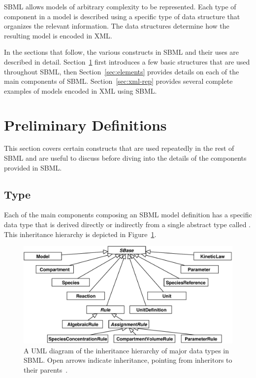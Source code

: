 \documentclass[10pt]{cekarticle}
\newcommand{\vref}[1]{\ref{#1}}
\newcommand{\changed}[1]{\textcolor{BrickRed}{#1}}
\begin{document}
SBML allows models of arbitrary complexity to be represented.  Each type of
component in a model is described using a specific type of data structure
that organizes the relevant information.  The data structures determine how
the resulting model is encoded in XML.

In the sections that follow, the various constructs in SBML and their uses
are described in detail.  Section~\ref{sec:general} first introduces a few
basic structures that are used throughout SBML, then
Section~\ref{sec:elements} provides details on each of the main components
of SBML.  Section~\ref{sec:xml-rep} provides several complete examples of
models encoded in XML using SBML.


\section{Preliminary Definitions}
\label{sec:general}

This section covers certain constructs that are used repeatedly in the rest
of SBML and are useful to discuss before diving into the details of the
components provided in SBML.

\subsection{Type }
\label{sec:sbase}

Each of the main components composing an SBML model definition has a
specific data type that is derived directly or indirectly from a single
\changed{abstract} type called .  This inheritance hierarchy
is depicted in Figure~\vref{fig:top-level}.

\begin{figure}[ht]
  \centering
  \includegraphics[scale = 0.7]{figs/top-level}
  \caption{A UML diagram of the inheritance hierarchy of major data types
    in SBML.  Open arrows indicate inheritance, pointing from inheritors to 
    their parents~\citep{eriksson:1998,oestereich:1999}.}
  \label{fig:top-level}
\end{figure}
\end{document}
